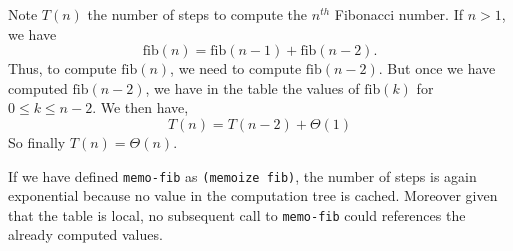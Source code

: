 \documentclass[a4paper,12pt]{article}
\begin{document}
Note $T(n)$ the number of steps to compute the $n^{th}$ Fibonacci number.
If $n > 1$, we have
\[ \mathrm{fib}(n) = \mathrm{fib}(n-1) + \mathrm{fib}(n-2).\]
Thus, to compute $\mathrm{fib}(n)$, we need to compute
$\mathrm{fib}(n-2)$.  But once we have computed $\mathrm{fib}(n-2)$,
we have in the table the values of $\mathrm{fib}(k)$ for $0 \le k\le
n-2$.  We then have,
\[ T(n) = T(n-2) + \Theta(1)\]
So finally $T(n) = \Theta(n)$.

\medskip
If we have defined \lstinline!memo-fib! as \lstinline!(memoize fib)!,
the number of steps is again exponential because no value in the
computation tree is cached.  Moreover given that the table is local,
no subsequent call to \lstinline!memo-fib! could references the
already computed values.
\end{document}
